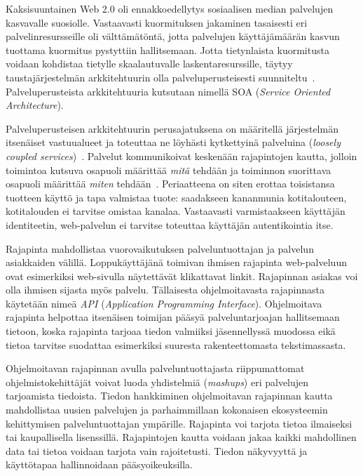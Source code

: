 \documentclass[finnish,gradu]{tktltiki}
\begin{document}
  Kaksisuuntainen Web 2.0 oli ennakkoedellytys sosiaalisen median palvelujen kasvavalle suosiolle. Vastaavasti kuormituksen jakaminen tasaisesti eri palvelinresursseille oli välttämätöntä, jotta palvelujen käyttäjämäärän kasvun tuottama kuormitus pystyttiin hallitsemaan. Jotta tietynlaista kuormitusta voidaan kohdistaa tietylle skaalautuvalle laskentaresurssille, täytyy taustajärjestelmän arkkitehtuurin olla palveluperusteisesti suunniteltu~\cite{soa_in_practise_2007}. Palveluperusteista arkkitehtuuria kutsutaan nimellä SOA (\emph{Service Oriented Architecture}).

  Palveluperusteisen arkkitehtuurin perusajatuksena on määritellä järjestelmän itsenäiset vastuualueet ja toteuttaa ne löyhästi kytkettyinä palveluina (\emph{loosely coupled services})~\cite{soa_in_practise_2007}. Palvelut kommunikoivat keskenään rajapintojen kautta, jolloin toimintoa kutsuva osapuoli määrittää \emph{mitä} tehdään ja toiminnon suorittava osapuoli määrittää \emph{miten} tehdään~\cite{federated_auth_case_2008}. Periaatteena on siten erottaa toisistansa tuotteen käyttö ja tapa valmistaa tuote: saadakseen kananmunia kotitalouteen, kotitalouden ei tarvitse omistaa kanalaa. Vastaavasti varmistaakseen käyttäjän identiteetin, web-palvelun ei tarvitse toteuttaa käyttäjän autentikointia itse.

  Rajapinta mahdollistaa vuorovaikutuksen palveluntuottajan ja palvelun asiakkaiden välillä. Loppukäyttäjänä toimivan ihmisen rajapinta web-palveluun ovat esimerkiksi web-sivulla näytettävät klikattavat linkit. Rajapinnan asiakas voi olla ihmisen sijasta myös palvelu. Tällaisesta ohjelmoitavasta rajapinnasta käytetään nimeä \emph{API} (\emph{Application Programming Interface}). Ohjelmoitava rajapinta helpottaa itsenäisen toimijan pääsyä palveluntarjoajan hallitsemaan tietoon, koska rajapinta tarjoaa tiedon valmiiksi jäsennellyssä muodossa eikä tietoa tarvitse suodattaa esimerkiksi suuresta rakenteettomasta tekstimassasta.

  Ohjelmoitavan rajapinnan avulla palveluntuottajasta riippumattomat ohjelmistokehittäjät voivat luoda yhdistelmiä (\emph{mashups}) eri palvelujen tarjoamista tiedoista. Tiedon hankkiminen ohjelmoitavan rajapinnan kautta mahdollistaa uusien palvelujen ja parhaimmillaan kokonaisen ekosysteemin kehittymisen palveluntuottajan ympärille. Rajapinta voi tarjota tietoa ilmaiseksi tai kaupallisella lisenssillä. Rajapintojen kautta voidaan jakaa kaikki mahdollinen data tai tietoa voidaan tarjota vain rajoitetusti. Tiedon näkyvyyttä ja käyttötapaa hallinnoidaan pääsyoikeuksilla.
\end{document}
